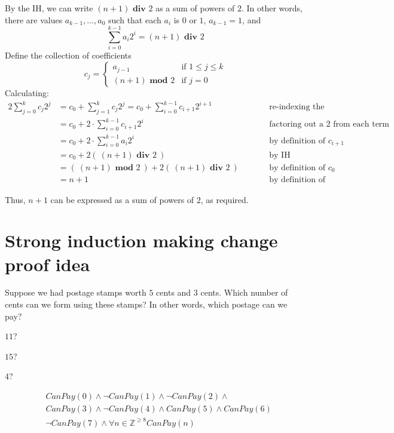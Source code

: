 \documentclass[12pt, oneside]{article}
\begin{document}
By the IH, we can write $(n+1) \textbf{ div } 2$ as 
a sum of powers of $2$. In other words, 
there are values $a_{k-1}, \ldots, a_0$ such that each $a_i$ is $0$ or $1$, $a_{k-1} = 1$, 
and
\[
    \sum_{i=0}^{k-1} a_i 2^i = (n+1) \textbf{ div } 2   
\]
Define the collection of coefficients
\[
   c_{j} = 
   \begin{cases}
        a_{j-1} \qquad&\text{if $1 \leq j \leq k$}\\
        (n+1) \textbf{ mod } 2 &\text{if $j = 0$}
   \end{cases}
\]
Calculating: 
\begin{alignat*}{2}
    \sum_{j=0}^k c_j 2^j &= c_0 + \sum_{j=1}^k c_j 2^j 
    = c_0 + \sum_{i=0}^{k-1} c_{i+1} 2^{i+1} &\qquad &\text{re-indexing the summation}\\
    &= c_0 + 2 \cdot \sum_{i=0}^{k-1} c_{i+1}2^i &\qquad &\text{factoring out a $2$ from each term in the sum}\\
    &= c_0 + 2 \cdot \sum_{i=0}^{k-1} a_{i} 2^i &\qquad &\text{by definition of $c_{i+1}$}\\
    &= c_0 + 2 \left(~(n+1) \textbf{ div } 2 ~\right) &\qquad &\text{by IH} \\
    &= \left(~ (n+1) \textbf{ mod } 2 ~\right ) + 2 \left(~(n+1) \textbf{ div } 2 ~\right) &\qquad &\text{by definition of $c_0$} \\
    &= n+1 &\qquad&\text{by definition of long division}
\end{alignat*}

Thus, $n+1$ can be expressed as a sum of powers of $2$, as required. \vfill
\section*{Strong induction making change proof idea}


Suppose we had postage stamps worth $5$ cents and $3$ cents.
Which number of cents can we form using these stamps?
In other words, which postage can we pay?

$11$? 

$15$? 


$4$?



\begin{align*}
    &CanPay(0) \land \lnot CanPay(1) \land \lnot CanPay(2) \land \\
    &CanPay(3) \land \lnot CanPay(4) \land CanPay(5) \land CanPay(6) \\
    &\lnot CanPay(7) \land \forall n \in \mathbb{Z}^{\geq 8} CanPay(n)
\end{align*}
\end{document}
